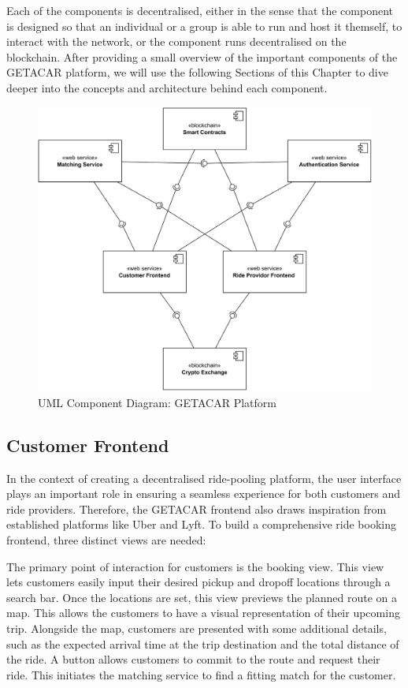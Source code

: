 Each of the components is decentralised, either in the sense that the component is designed so that an individual or a group is able to run and host it themself, to interact with the network, or the component runs decentralised on the blockchain. After providing a small overview of the important components of the GETACAR platform, we will use the following Sections of this Chapter to dive deeper into the concepts and architecture behind each component. 

\begin{figure}[h]
    \centering
    \includegraphics[width=\linewidth]{data/10.svg}
    \caption{UML Component Diagram: GETACAR Platform}
    \label{fig:stern}
\end{figure}

\subsection{Customer Frontend}\label{subsec:UserFrontend}
In the context of creating a decentralised ride-pooling platform, the user interface plays an important role in ensuring a seamless experience for both customers and ride providers. Therefore, the GETACAR frontend also draws inspiration from established platforms like Uber and Lyft. To build a comprehensive ride booking frontend, three distinct views are needed:

The primary point of interaction for customers is the booking view. This view lets customers easily input their desired pickup and dropoff locations through a search bar. Once the locations are set, this view previews the planned route on a map. This allows the customers to have a visual representation of their upcoming trip. Alongside the map, customers are presented with some additional details, such as the expected arrival time at the trip destination and the total distance of the ride. A button allows customers to commit to the route and request their ride. This initiates the matching service to find a fitting match for the customer.

